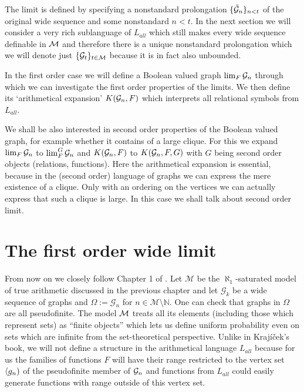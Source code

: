 \vspace{1em}
The limit is defined by specifying a nonstandard prolongation $\{\tilde {\mathcal{G}}_n\}_{n<t}$ of the original wide sequence and some nonstandard $n < t$. In the next section we will consider a very rich sublanguage of $L_{all}$ which still makes every wide sequence definable in $\mathcal{M}$ and therefore there is a unique nonstandard prolongation which we will denote just $\{\mathcal{G}_t\}_{t\in\mathcal{M}}$ because it is in fact also unbounded.

In the first order case we will define a Boolean valued graph $\lim_F\mathcal{G}_n$ through which we can investigate the first order properties of the limits. We then define its `arithmetical expansion' $K(\mathcal{G}_n,F)$ which interprets all relational symbols from $L_{all}$. 

We shall be also interested in second order properties of the Boolean valued graph,
for example whether it contains of a large clique.  For this we expand
$\lim_F\mathcal{G}_n$ to $\lim_F^G\mathcal{G}_n$ and $K(\mathcal{G}_n,F)$ to $K(\mathcal{G}_n,F,G)$ with $G$ being second order objects (relations, functions). Here the arithmetical expansion is essential, because in the (second order) language of graphs we can express the mere existence of a clique. Only with an ordering on the vertices we can actually express that such a clique is large. In this case we shall talk about second order limit.

\section{The first order wide limit}



From now on we closely follow Chapter 1 of \cite{krajicek2010forcing}. Let $\mathcal{M}$ be the $\aleph_1$-saturated model of true arithmetic discussed in the previous chapter and let $\mathcal{G}_k$ be a wide sequence of graphs and $\Omega:=\mathcal{G}_n$ for $n\in\mathcal{M}\setminus \mathbb{N}$. One can check that graphs in $\Omega$ are all pseudofinite. The model $\mathcal{M}$ treats all its elements (including those which represent sets) as ``finite objects'' which lets us define uniform probability even on sets which are infinite from the set-theoretical perspective. Unlike in Krajíček's book, we will not define a structure in the arithmetical language $L_{all}$ because for us the families of functions $F$ will have their range restricted to the vertex set $\langle g_n)$ of the pseudofinite member of $\mathcal{G}_n$ and functions from $L_{all}$ could easily generate functions with range outside of this vertex set.

